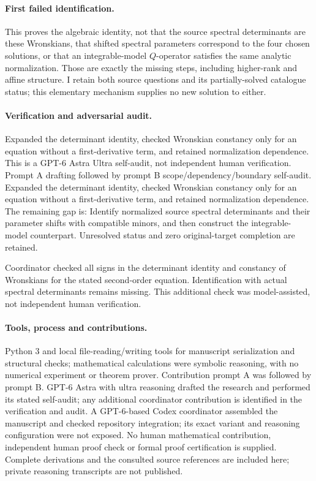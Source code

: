 \documentclass[11pt]{article}
\begin{document}
\paragraph{First failed identification.} This proves the algebraic identity, not that the source spectral determinants are these Wronskians, that shifted spectral parameters correspond to the four chosen solutions, or that an integrable-model \(Q\)-operator satisfies the same analytic normalization. Those are exactly the missing steps, including higher-rank and affine structure. I retain both source questions and its partially-solved catalogue status; this elementary mechanism supplies no new solution to either.

\paragraph{Verification and adversarial audit.}
Expanded the determinant identity, checked Wronskian constancy only for an equation without a first-derivative term, and retained normalization dependence. This is a GPT-6 Astra Ultra self-audit, not independent human verification. Prompt A drafting followed by prompt B scope/dependency/boundary self-audit. Expanded the determinant identity, checked Wronskian constancy only for an equation without a first-derivative term, and retained normalization dependence. The remaining gap is: Identify normalized source spectral determinants and their parameter shifts with compatible minors, and then construct the integrable-model counterpart. Unresolved status and zero original-target completion are retained.

Coordinator checked all signs in the determinant identity and constancy of Wronskians for the stated second-order equation. Identification with actual spectral determinants remains missing. This additional check was model-assisted, not independent human verification.

\paragraph{Tools, process and contributions.}
Python 3 and local file-reading/writing tools for manuscript serialization and structural checks; mathematical calculations were symbolic reasoning, with no numerical experiment or theorem prover. Contribution prompt A was followed by prompt B. GPT-6 Astra with ultra reasoning drafted the research and performed its stated self-audit; any additional coordinator contribution is identified in the verification and audit. A GPT-6-based Codex coordinator assembled the manuscript and checked repository integration; its exact variant and reasoning configuration were not exposed. No human mathematical contribution, independent human proof check or formal proof certification is supplied. Complete derivations and the consulted source references are included here; private reasoning transcripts are not published.
\end{document}
